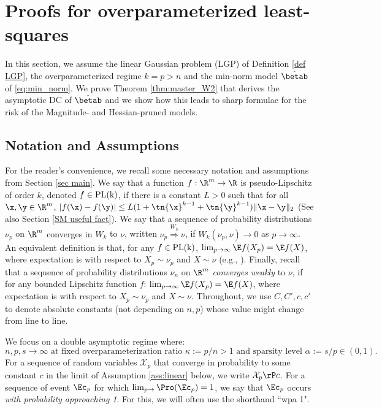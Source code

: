 
\section{Proofs for overparameterized least-squares}\label{sec proof thm 1}
In this section, we assume the linear Gaussian problem (LGP) of Definition \ref{def LGP}, the overparameterized regime $k=p>n$ and the min-norm model $\hat\betab$ of \eqref{eq:min_norm}. We prove Theorem \ref{thm:master_W2} that derives the asymptotic DC of $\hat\betab$ and we show how this leads to sharp formulae for the risk of the Magnitude- and Hessian-pruned models.


\subsection{Notation and Assumptions}\label{sec:ass_app}
For the reader's convenience, we recall some necessary notation and assumptions from Section \ref{sec main}.  We say that a function $f:\R^m\rightarrow\R$ is pseudo-Lipschitz of order $k$, denoted $f\in\rm{PL}(k)$, if there is a constant $L>0$ such that for all $\x,\y\in\R^m$,
$
|f(\x) - f(\y)|\leq L(1+\tn{\x}^{k-1}+\tn{\y}^{k-1})\|\x-\y\|_2 
$
(See also Section \ref{SM useful fact}). 
We say that a sequence of probability distributions $\nu_p$ on $\R^m$ {converges in $W_k$} to 
$\nu$, written $\nu_p\stackrel{W_k}{\Longrightarrow} \nu$, if $W_k(\nu_p,\nu) \rightarrow 0$ as $p \rightarrow \infty$. An equivalent definition is that, for any $f\in\rm{PL}(k)$, $\lim_{p\rightarrow\infty}\E f(X_p)=\E f(X)$, where expectation is with respect to $X_p\sim\nu_p$ and $X\sim\nu$ (e.g., \cite{montanari2017estimation}).  
%
Finally, recall that a sequence of probability distributions $\nu_n$ on $\R^m$ \emph{converges weakly} to $\nu$, if for any bounded Lipschitz function $f$: $\lim_{p\rightarrow\infty}\E f(X_p)=\E f(X)$, where expectation is with respect to $X_p\sim\nu_p$ and $X\sim\nu$.
%
Throughout, we use $C,C',c,c'$ to denote absolute constants (not depending on $n,p$) whose value might change from line to line. 


We focus on a double asymptotic regime where:
$$n,p,s\rightarrow\infty \text{ at fixed overparameterization ratio } \kappa:=p/n>1 \text{ and sparsity level } \alpha:=s/p\in(0,1).$$  
%
For a sequence of random variables $\mathcal{X}_{p}$ that converge in probability to some constant $c$ in the limit of Assumption \ref{ass:linear} below, we  write $\mathcal{X}_{p}\rP c$. For a sequence of event $\Ec_p$ for which $\lim_{p\rightarrow}\Pro(\Ec_p) = 1$, we say that $\Ec_p$ occurs \emph{with probability approaching 1}. For this, we will often use the shorthand ``wpa 1".

